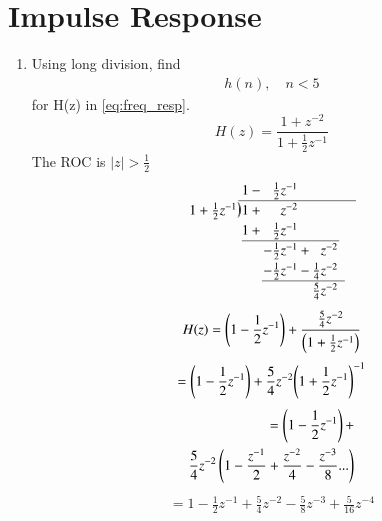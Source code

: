 \documentclass[journal,12pt,twocolumn]{IEEEtran}
\newcommand{\longdiv}{\smash{\mkern-0.43mu\vstretch{1.31}{\hstretch{.7}{)}}\mkern-5.2mu\vstretch{1.31}{\hstretch{.7}{)}}}}
\renewcommand\thesection{\arabic{section}}
\begin{document}
\section{Impulse Response}
\begin{enumerate}[label=\thesection.\arabic*]
\item Using long division, 
find
\begin{align}
	h(n), \quad n < 5
\end{align}
for H(z) in 
\eqref{eq:freq_resp}. \\
\solution
\begin{equation}
	H(z) = \frac{1 + z^{-2}}{1 + \frac{1}{2}z^{-1}}
\end{equation}
The ROC is $|z| > \frac{1}{2}$
\[
\arraycolsep=1pt
\renewcommand\arraystretch{1.2}
\begin{array}{*1r @{\hskip\arraycolsep}c@{\hskip\arraycolsep} *{11}r}
	&          & 1 & - & \frac{1}{2}z^{-1}   \\
	\cline{2-13}
	1+\frac{1}{2}z^{-1} & \longdiv & 1 & + & z^{-2} &   &      &   &      &   &      &   &        \\
	&          & 1 & + & \frac{1}{2}z^{-1} &   &      &   &      &   &        \\
	\cline{3-7}
	&          &   &   & -\frac{1}{2}z^{-1} & + &  z^{-2} &   &      &   &      &   &        \\
	&          &   &   & -\frac{1}{2}z^{-1} & - & \frac{1}{4}z^{-2} &  &   &      &   &        \\
	\cline{5-9}
	&          &   &   &   &   & \frac{5}{4}z^{-2} &   &      &   &        \\
\end{array}
\]
\begin{equation}
	H(z) = \left(1 - \frac{1}{2}z^{-1}\right) + \frac{\frac{5}{4}z^{-2}}{\left(1 + \frac{1}{2}z^{-1}\right)}
\end{equation}
\begin{equation}
	= \left(1 - \frac{1}{2}z^{-1}\right) + \frac{5}{4}z^{-2}{\left(1 + \frac{1}{2}z^{-1}\right)}^{-1}
\end{equation}
\begin{align*}
	= \left(1 - \frac{1}{2}z^{-1}\right) +\\ \frac{5}{4}z^{-2}\left(1 - \frac{z^{-1}}{2} + \frac{z^{-2}}{4} - \frac{z^{-3}}{8} ...\right)
\end{align*}
\begin{align}
	= 1 - \frac{1}{2}z^{-1} + \frac{5}{4}z^{-2} - \frac{5}{8}z^{-3} + \frac{5}{16}z^{-4}
\end{align}

\end{enumerate}
\end{document}
